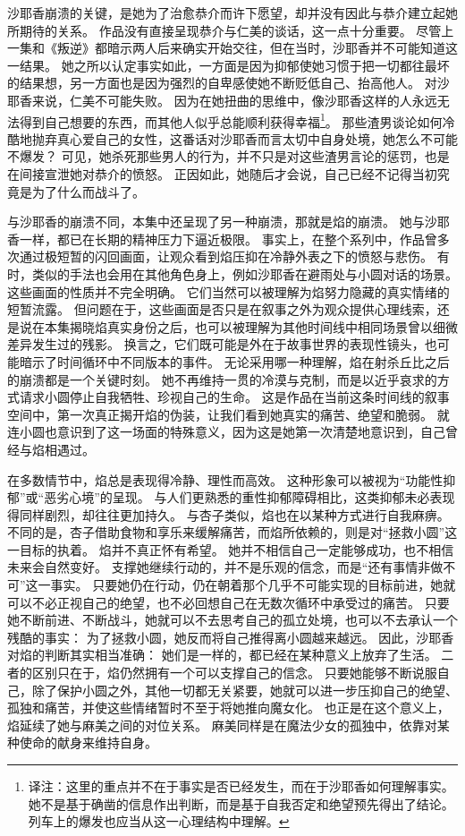 沙耶香崩溃的关键，是她为了治愈恭介而许下愿望，却并没有因此与恭介建立起她所期待的关系。
作品没有直接呈现恭介与仁美的谈话，这一点十分重要。
尽管上一集和《叛逆》都暗示两人后来确实开始交往，但在当时，沙耶香并不可能知道这一结果。
她之所以认定事实如此，一方面是因为抑郁使她习惯于把一切都往最坏的结果想，另一方面也是因为强烈的自卑感使她不断贬低自己、抬高他人。
对沙耶香来说，仁美不可能失败。
因为在她扭曲的思维中，像沙耶香这样的人永远无法得到自己想要的东西，而其他人似乎总能顺利获得幸福\footnote{%
    译注：这里的重点并不在于事实是否已经发生，而在于沙耶香如何理解事实。
    她不是基于确凿的信息作出判断，而是基于自我否定和绝望预先得出了结论。
    列车上的爆发也应当从这一心理结构中理解。
}。
那些渣男谈论如何冷酷地抛弃真心爱自己的女性，这番话对沙耶香而言太切中自身处境，她怎么不可能不爆发？
可见，她杀死那些男人的行为，并不只是对这些渣男言论的惩罚，也是在间接宣泄她对恭介的愤怒。
正因如此，她随后才会说，自己已经不记得当初究竟是为了什么而战斗了。

与沙耶香的崩溃不同，本集中还呈现了另一种崩溃，那就是焰的崩溃。
她与沙耶香一样，都已在长期的精神压力下逼近极限。
事实上，在整个系列中，作品曾多次通过极短暂的闪回画面，让观众看到焰压抑在冷静外表之下的愤怒与悲伤。
有时，类似的手法也会用在其他角色身上，例如沙耶香在避雨处与小圆对话的场景。
这些画面的性质并不完全明确。
它们当然可以被理解为焰努力隐藏的真实情绪的短暂流露。
但问题在于，这些画面是否只是在叙事之外为观众提供心理线索，还是说在本集揭晓焰真实身份之后，也可以被理解为其他时间线中相同场景曾以细微差异发生过的残影。
换言之，它们既可能是外在于故事世界的表现性镜头，也可能暗示了时间循环中不同版本的事件。
无论采用哪一种理解，焰在射杀丘比之后的崩溃都是一个关键时刻。
她不再维持一贯的冷漠与克制，而是以近乎哀求的方式请求小圆停止自我牺牲、珍视自己的生命。
这是作品在当前这条时间线的叙事空间中，第一次真正揭开焰的伪装，让我们看到她真实的痛苦、绝望和脆弱。
就连小圆也意识到了这一场面的特殊意义，因为这是她第一次清楚地意识到，自己曾经与焰相遇过。

在多数情节中，焰总是表现得冷静、理性而高效。
这种形象可以被视为“功能性抑郁”或“恶劣心境”的呈现。
与人们更熟悉的重性抑郁障碍相比，这类抑郁未必表现得同样剧烈，却往往更加持久\cite{ref47}。
与杏子类似，焰也在以某种方式进行自我麻痹。
不同的是，杏子借助食物和享乐来缓解痛苦，而焰所依赖的，则是对“拯救小圆”这一目标的执着。
焰并不真正怀有希望。
她并不相信自己一定能够成功，也不相信未来会自然变好。
支撑她继续行动的，并不是乐观的信念，而是“还有事情非做不可”这一事实。
只要她仍在行动，仍在朝着那个几乎不可能实现的目标前进，她就可以不必正视自己的绝望，也不必回想自己在无数次循环中承受过的痛苦。
只要她不断前进、不断战斗，她就可以不去思考自己的孤立处境，也可以不去承认一个残酷的事实：
为了拯救小圆，她反而将自己推得离小圆越来越远。
因此，沙耶香对焰的判断其实相当准确：
她们是一样的，都已经在某种意义上放弃了生活。
二者的区别只在于，焰仍然拥有一个可以支撑自己的信念。
只要她能够不断说服自己，除了保护小圆之外，其他一切都无关紧要，她就可以进一步压抑自己的绝望、孤独和痛苦，并使这些情绪暂时不至于将她推向魔女化。
也正是在这个意义上，焰延续了她与麻美之间的对位关系。
麻美同样是在魔法少女的孤独中，依靠对某种使命的献身来维持自身。


